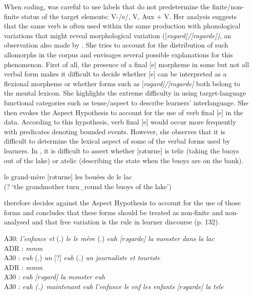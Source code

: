\documentclass[output=paper,colorlinks,citecolor=brown,modfonts,nonflat]{../langscibook}
\begin{document}
When coding, \citet{Granget2015} was careful to use labels that do not predetermine the finite/non-finite status of the target elements: V-/e/, V, Aux + V. Her analysis suggests that the same verb is often used within the same production with phonological variations that might reveal morphological variation ([\textit{r}ə\textit{gard]{\slash}[r}ə\textit{garde])}, an observation also made by \citet{Prévost2007French, Prévost2007English}. She tries to account for the distribution of such allomorphs in the corpus and envisages several possible explanations for this phenomenon. First of all, the presence of a final [e] morpheme in some but not all verbal form makes it difficult to decide whether [e] can be interpreted as a flexional morpheme or whether forms such as [\textit{r}ə\textit{gard]/[r}ə\textit{garde]} both belong to the mental lexicon. She highlights the extreme difficulty in using target-language functional categories such as tense/aspect to describe learners’ interlanguage. She then evokes the Aspect Hypothesis to account for the use of verb final [e] in the data. According to this hypothesis, verb final [e] would occur more frequently with predicates denoting bounded events. However, she observes that it is difficult to determine the lexical aspect of some of the verbal forms used by learners. In , it is difficult to assert whether [rəturne] is telic (taking the buoys out of the lake) or atelic (describing the state when the buoys are on the bank).

\ea%
    \label{ex:leclerq:13}
 \gll        {} {le}  {grand-mère}  {[rəturne]}  {les}  {bouées}  {de}  {le}  {lac}\\
         (? ‘the grandmother turn\_round the buoys of the lake’)\\
    \z

\citet{Granget2015} therefore decides against the Aspect Hypothesis to account for the use of those forms and concludes that these forms should be treated as non-finite and non-analysed and that free variation is the rule in learner discourse (p. 132).

\ea%
    \label{ex:leclerq:14}
A30: \textit{l’enfance et} (.) \textit{le le mère} (.) \textit{euh [rəgarde] la monster dans la lac}\\
ADR : \textit{mmm}\\
A30 : \textit{euh} (.) \textit{un} [?] \textit{euh} (.) \textit{un journaliste et touriste}\\
ADR : \textit{mmm}\\
A30 : \textit{euh [rəgard] la monster euh}\\
A30 : \textit{euh (.)~maintenant euh l’enfance le enf les enfants [rəgarde] la tele}
    \z
\end{document}
